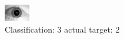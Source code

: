 \begin{figure}[h!]
\begin{center}
\includegraphics[width=0.60\columnwidth]{figures/ID1692_class_3_target_2.png}
\end{center}
\caption{ Classification: 3 actual target: 2}
\label{fig:ID1692_class_3_target_2}
\end{figure}
